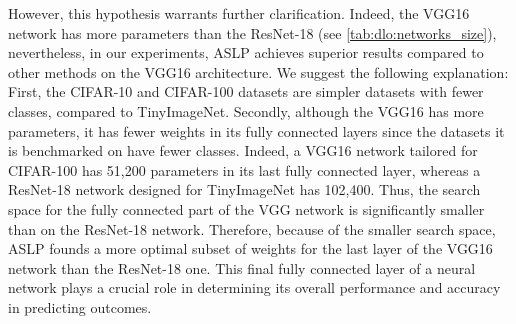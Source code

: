However, this hypothesis warrants further clarification. Indeed, the VGG16
network has more parameters than the ResNet-18 (see
\cref{tab:dlo:networks_size}), nevertheless, in our experiments, \ac{ASLP}
achieves superior results compared to other methods on the VGG16 architecture.
We suggest the following explanation: First, the CIFAR-10 and CIFAR-100 datasets
are simpler datasets with fewer classes, compared to TinyImageNet. Secondly,
although the VGG16 has more parameters, it has fewer weights in its fully
connected layers since the datasets it is benchmarked on have fewer classes.
Indeed, a VGG16 network tailored for CIFAR-100 has 51,200 parameters in its last
fully connected layer, whereas a ResNet-18 network designed for TinyImageNet has
102,400. Thus, the search space for the fully connected part of the VGG network
is significantly smaller than on the ResNet-18 network. Therefore, because of
the smaller search space, \ac{ASLP} founds a more optimal subset of weights for
the last layer of the VGG16 network than the ResNet-18 one. This final fully
connected layer of a neural network plays a crucial role in determining its
overall performance and accuracy in predicting outcomes.\\







